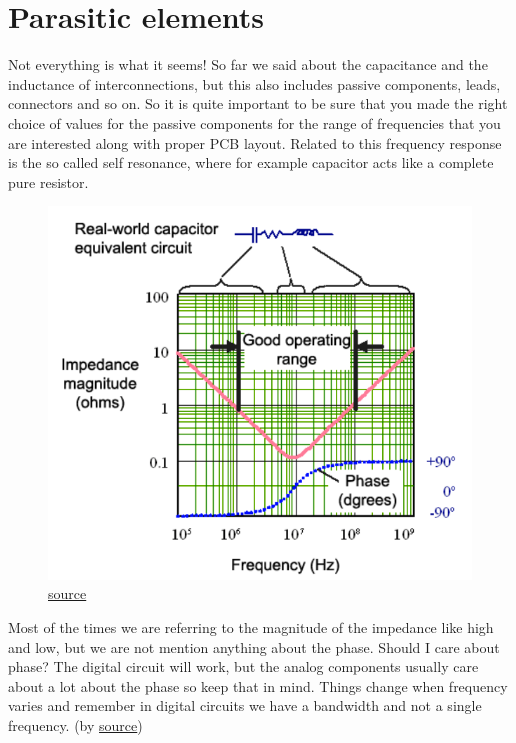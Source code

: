\documentclass[final]{cubedoc}
\begin{document}
	
	
	\section{Parasitic elements}
	
	Not everything is what it seems! So far we said about the capacitance and the inductance of interconnections, but this also includes passive components, leads, connectors and so on. So it is quite important to be sure that you made the right choice of values for the passive components for the range of frequencies that you are interested along with proper PCB layout. Related to this frequency response is the so called self resonance, where for example capacitor acts like a complete pure resistor.
	
	\begin{figure}[h!]
		\centering
		\includegraphics[keepaspectratio, height=.4\textheight, width = \textwidth]{assets/real_cap.png}
		\caption{\href{http://www.sigcon.com/Pubs/straight/resonance.htm}{source}}
	\end{figure}
	
	Most of the times we are referring to the magnitude of the impedance like high and low, but we are not mention anything about the phase. Should I care about phase? The digital circuit will work, but the analog components usually care about a lot about the phase so keep that in mind. Things change when frequency varies and remember in digital circuits we have a bandwidth and not a single frequency. (by \href{http://www.sigcon.com/Pubs/straight/resonance.htm}{source})
	
\end{document}
